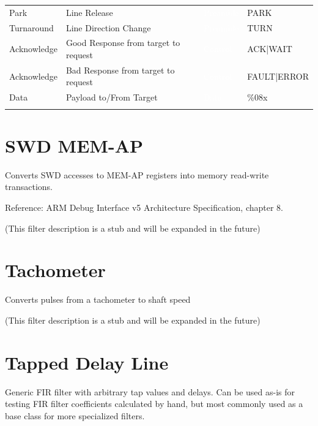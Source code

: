 \begin{tabularx}{16cm}{lllX}
\thinhline
Park & Line Release & \cellcolor{preamble}\textcolor{white}{Preamble} & PARK \\
\thinhline
Turnaround & Line Direction Change & \cellcolor{preamble}\textcolor{white}{Preamble} & TURN \\
\thinhline
Acknowledge & Good Response from target to request & \cellcolor{control}\textcolor{white}{Control} & ACK|WAIT    \\
\thinhline
Acknowledge & Bad Response from target to request & \cellcolor{control}\textcolor{white}{Control} & FAULT|ERROR    \\
\thinhline
Data & Payload to/From Target & \cellcolor{data}\textcolor{white}{Data} & \%08x \\
\thinhline

\thickhline
\end{tabularx}

\pagebreak
\section{SWD MEM-AP}

Converts SWD accesses to MEM-AP registers into memory read-write transactions.

Reference: ARM Debug Interface v5 Architecture Specification, chapter 8.

(This filter description is a stub and will be expanded in the future)

\pagebreak
\section{Tachometer}

Converts pulses from a tachometer to shaft speed

(This filter description is a stub and will be expanded in the future)

\pagebreak
\section{Tapped Delay Line}

Generic FIR filter with arbitrary tap values and delays. Can be used as-is for testing FIR filter coefficients
calculated by hand, but most commonly used as a base class for more specialized filters.

